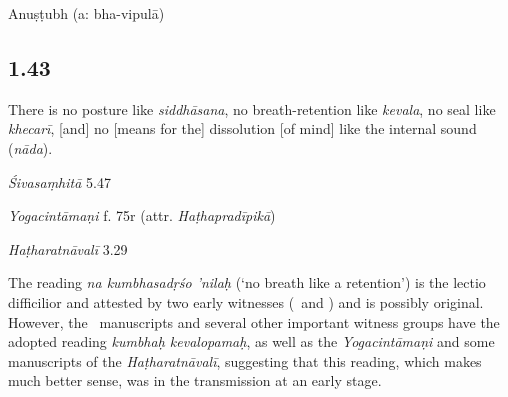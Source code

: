 \begin{ekdosis}
\begin{metre}[hp01_042]
Anuṣṭubh (a: bha-vipulā)
\end{metre}

\subsection*{1.43}
\begin{translation}[hp01_043]
There is no posture like \emph{siddhāsana}, no breath-retention like \emph{kevala}, no seal like \emph{khecarī}, [and] no [means for the] dissolution [of mind] like the internal sound (\emph{nāda}).
\end{translation}

\begin{sources}[hp01_043]
\emph{Śivasaṃhitā} 5.47

\begin{versinnote}
\end{versinnote}

\end{sources}

\begin{testimonia}[hp01_043]
\emph{Yogacintāmaṇi} f. 75r (attr. \emph{Haṭhapradīpikā})

\begin{versinnote}
\end{versinnote}

\emph{Haṭharatnāvalī} 3.29

\begin{versinnote}
\tl{\var{kumbhaḥ kevalopamaḥ ] kumbhasadṛśo 'nilaḥ N,n1,n2,n3,J}\\!}
\end{versinnote}

\end{testimonia}

\begin{philcomm}[hp01_043]
The reading \emph{na kumbhasadṛśo 'nilaḥ} (`no breath like a retention') is the lectio difficilior and attested by two early witnesses (\etaOne\ and \etaTwo) and is possibly original. However, the \textalpha\ manuscripts and several other important witness groups have the adopted reading \emph{kumbhaḥ kevalopamaḥ}, as well as the \emph{Yogacintāmaṇi} and some manuscripts of the \emph{Haṭharatnāvalī}, suggesting that this reading, which makes much better sense, was in the transmission at an early stage.    
%
\end{philcomm}


\end{ekdosis}
